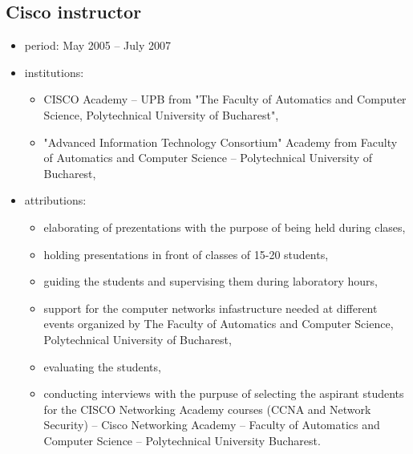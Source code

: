 	\subsection{Cisco instructor}
		\begin{itemize}
			\item period: May 2005 – July 2007 
			\item institutions: 
			\begin{itemize}
			 	\item CISCO Academy – UPB from "The Faculty of Automatics and Computer Science, Polytechnical University of Bucharest", 
				\item "Advanced Information Technology Consortium" Academy from Faculty of Automatics and Computer Science – Polytechnical University of Bucharest,
			\end{itemize}
			\item attributions:
			\begin{itemize}
			 	\item elaborating of prezentations with the purpose of being held during clases,
				\item holding presentations in front of classes of 15-20 students,
				\item guiding the students and supervising them during laboratory hours,
				\item support for the computer networks infastructure needed at different events organized by The Faculty of Automatics and Computer Science, Polytechnical University of Bucharest,
				\item evaluating the students,
				\item conducting interviews with the purpuse of selecting the aspirant students for the CISCO Networking Academy courses (CCNA and Network Security) – Cisco Networking Academy – Faculty of Automatics and Computer Science – Polytechnical University Bucharest. 
	
			\end{itemize}
		\end{itemize}
